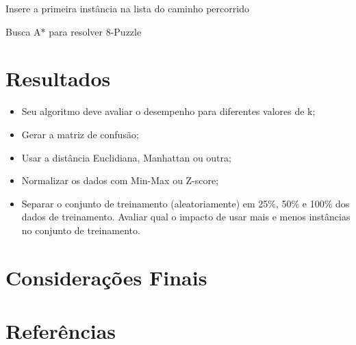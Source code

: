 \documentclass[12pt]{article}
\begin{document}
		\begin{algorithm}[H]
			Insere a primeira instância na lista do caminho percorrido\;
			\caption{Busca A* para resolver 8-Puzzle}
		\end{algorithm}



	\section{Resultados}\label{sec:resultados}

		\begin{itemize}
			\item Seu algoritmo deve avaliar o desempenho para diferentes valores de k;
			\item Gerar a matriz de confusão;
			\item Usar a distância Euclidiana, Manhattan ou outra;
			\item Normalizar os dados com Min-Max ou Z-score;
			\item Separar o conjunto de treinamento (aleatoriamente) em 25\%, 50\% e 100\% dos dados de treinamento. Avaliar qual o impacto de usar mais e menos instâncias no conjunto de treinamento.
		\end{itemize}


	\section{Considerações Finais}\label{sec:consideracoesFinais}

		

	\section{Referências}\label{sec:referencias}

		
\end{document}

